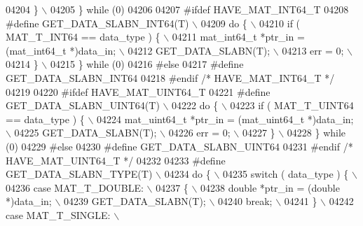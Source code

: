 \begin{DoxyCode}
{{{{{{{{{{{{{{{{{{{{{{{{{04204 \textcolor{preprocessor}{        \} \(\backslash\)}
04205 \textcolor{preprocessor}{    \} while (0)}
04206 
04207 \textcolor{preprocessor}{#ifdef HAVE\_MAT\_INT64\_T}
04208 \textcolor{preprocessor}{#define GET\_DATA\_SLABN\_INT64(T) \(\backslash\)}
04209 \textcolor{preprocessor}{    do \{ \(\backslash\)}
04210 \textcolor{preprocessor}{        if ( MAT\_T\_INT64 == data\_type ) \{ \(\backslash\)}
04211 \textcolor{preprocessor}{            mat\_int64\_t *ptr\_in = (mat\_int64\_t *)data\_in; \(\backslash\)}
04212 \textcolor{preprocessor}{            GET\_DATA\_SLABN(T); \(\backslash\)}
04213 \textcolor{preprocessor}{            err = 0; \(\backslash\)}
04214 \textcolor{preprocessor}{        \} \(\backslash\)}
04215 \textcolor{preprocessor}{    \} while (0)}
04216 \textcolor{preprocessor}{#else}
04217 \textcolor{preprocessor}{#define GET\_DATA\_SLABN\_INT64}
04218 \textcolor{preprocessor}{#endif }\textcolor{comment}{/* HAVE\_MAT\_INT64\_T */}\textcolor{preprocessor}{}
04219 
04220 \textcolor{preprocessor}{#ifdef HAVE\_MAT\_UINT64\_T}
04221 \textcolor{preprocessor}{#define GET\_DATA\_SLABN\_UINT64(T) \(\backslash\)}
04222 \textcolor{preprocessor}{    do \{ \(\backslash\)}
04223 \textcolor{preprocessor}{        if ( MAT\_T\_UINT64 == data\_type ) \{ \(\backslash\)}
04224 \textcolor{preprocessor}{            mat\_uint64\_t *ptr\_in = (mat\_uint64\_t *)data\_in; \(\backslash\)}
04225 \textcolor{preprocessor}{            GET\_DATA\_SLABN(T); \(\backslash\)}
04226 \textcolor{preprocessor}{            err = 0; \(\backslash\)}
04227 \textcolor{preprocessor}{        \} \(\backslash\)}
04228 \textcolor{preprocessor}{    \} while (0)}
04229 \textcolor{preprocessor}{#else}
04230 \textcolor{preprocessor}{#define GET\_DATA\_SLABN\_UINT64}
04231 \textcolor{preprocessor}{#endif }\textcolor{comment}{/* HAVE\_MAT\_UINT64\_T */}\textcolor{preprocessor}{}
04232 
04233 \textcolor{preprocessor}{#define GET\_DATA\_SLABN\_TYPE(T) \(\backslash\)}
04234 \textcolor{preprocessor}{    do \{ \(\backslash\)}
04235 \textcolor{preprocessor}{        switch ( data\_type ) \{ \(\backslash\)}
04236 \textcolor{preprocessor}{            case MAT\_T\_DOUBLE: \(\backslash\)}
04237 \textcolor{preprocessor}{            \{ \(\backslash\)}
04238 \textcolor{preprocessor}{                double *ptr\_in = (double *)data\_in; \(\backslash\)}
04239 \textcolor{preprocessor}{                GET\_DATA\_SLABN(T); \(\backslash\)}
04240 \textcolor{preprocessor}{                break; \(\backslash\)}
04241 \textcolor{preprocessor}{            \} \(\backslash\)}
04242 \textcolor{preprocessor}{            case MAT\_T\_SINGLE: \(\backslash\)}
}}}}}}}}}}}}}}}}}}}}}}}}}
\end{DoxyCode}
